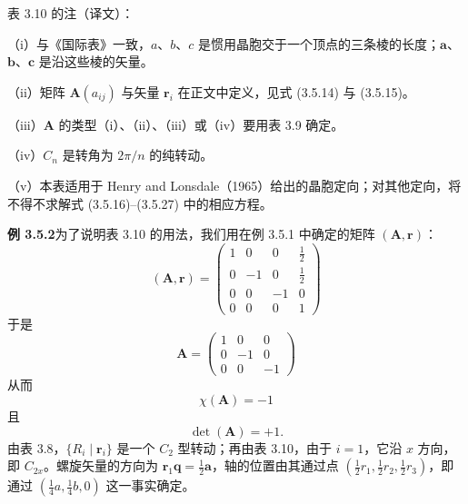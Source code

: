 表 3.10 的注（译文）：

\noindent（i）与《国际表》一致，$a$、$b$、$c$ 是惯用晶胞交于一个顶点的三条棱的长度；$\mathbf{a}$、$\mathbf{b}$、$\mathbf{c}$ 是沿这些棱的矢量。

\noindent（ii）矩阵 $\mathbf{A}(a_{ij})$ 与矢量 $\mathbf{r}_{i}$ 在正文中定义，见式 (3.5.14) 与 (3.5.15)。

\noindent（iii）$\mathbf{A}$ 的类型（i）、（ii）、（iii）或（iv）要用表 3.9 确定。

\noindent（iv）$C_{n}$ 是转角为 $2\pi/n$ 的纯转动。

\noindent（v）本表适用于 Henry and Lonsdale（1965）给出的晶胞定向；对其他定向，将不得不求解式 (3.5.16)--(3.5.27) 中的相应方程。

\noindent\textbf{例 3.5.2}\quad 为了说明表 3.10 的用法，我们用在例 3.5.1 中确定的矩阵 $(\mathbf{A}, \mathbf{r})$：
\begin{equation*}
(\mathbf{A}, \mathbf{r}) = \begin{pmatrix} 1 & 0 & 0 & \frac{1}{2}\\ 0 & -1 & 0 & \frac{1}{2}\\ 0 & 0 & -1 & 0\\ 0 & 0 & 0 & 1 \end{pmatrix}
\tag{3.5.28}
\end{equation*}
于是
\begin{equation*}
\mathbf{A} = \begin{pmatrix} 1 & 0 & 0\\ 0 & -1 & 0\\ 0 & 0 & -1 \end{pmatrix}
\tag{3.5.29}
\end{equation*}
从而
\begin{equation*}
\chi(\mathbf{A}) = -1
\tag{3.5.30}
\end{equation*}
且
\begin{equation*}
\det(\mathbf{A}) = +1.
\tag{3.5.31}
\end{equation*}
由表 3.8，$\{R_{i} \mid \mathbf{r}_{i}\}$ 是一个 $C_{2}$ 型转动；再由表 3.10，由于 $i = 1$，它沿 $x$ 方向，即 $C_{2x}$。螺旋矢量的方向为 $\mathbf{r}_{1}\mathbf{q} = \frac{1}{2}\mathbf{a}$，轴的位置由其通过点 $\left(\frac{1}{2}r_{1}, \frac{1}{2}r_{2}, \frac{1}{2}r_{3}\right)$，即通过 $(\frac{1}{4}a, \frac{1}{4}b, 0)$ 这一事实确定。
